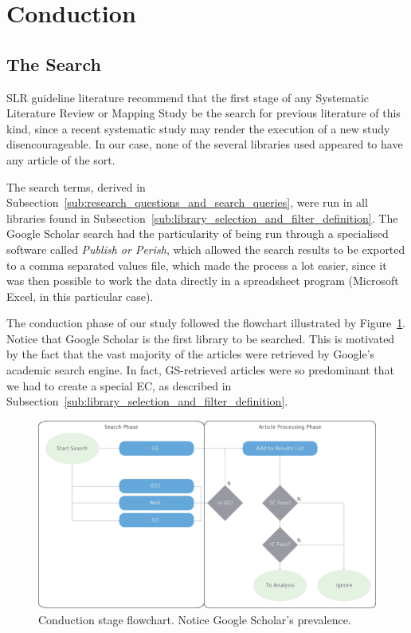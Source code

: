 
\section{Conduction}
\label{sec:conduction}
\subsection{The Search}
\label{sub:the_search}

SLR guideline literature \cite{Kitchenham2007,Tacconelli2010} recommend
that the first stage of any Systematic Literature Review or Mapping
Study be the search for previous literature of this kind, since a recent
systematic study may render the execution of a new study
disencourageable. In our case, none of the several libraries used
appeared to have any article of the sort.

The search terms, derived in
Subsection~\ref{sub:research_questions_and_search_queries}, were run in
all libraries found in
Subsection~\ref{sub:library_selection_and_filter_definition}. The Google
Scholar search had the particularity of being run through a specialised
software called \textit{Publish or Perish}\cite{Harzing}, which allowed
the search results to be exported to a comma separated values file,
which made the process a lot easier, since it was then possible to work
the data directly in a spreadsheet program (Microsoft Excel, in this
particular case).

The conduction phase of our study followed the flowchart illustrated by
Figure~\ref{fig:flowchart}. Notice that Google Scholar is the first
library to be searched. This is motivated by the fact that the vast
majority of the articles were retrieved by Google's academic search
engine. In fact, GS-retrieved articles were so predominant that we had
to create a special EC, as described in
Subsection~\ref{sub:library_selection_and_filter_definition}.

\begin{figure}[htpb]
    \centering
    \includegraphics[width=\linewidth]{img/flowchart.eps}
    \caption{Conduction stage flowchart. Notice Google Scholar's
    prevalence.}
    \label{fig:flowchart}
\end{figure}

